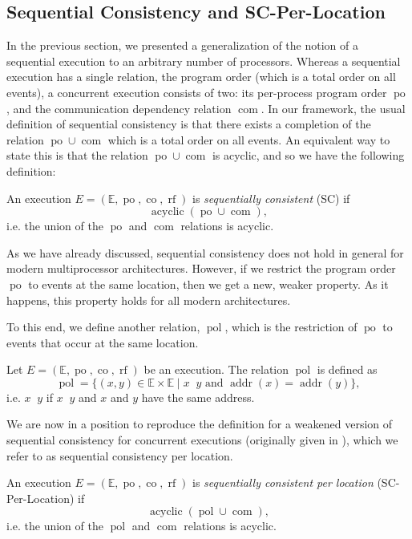 \documentclass[]{eptcs}
\newenvironment{definition}[1][Definition.]{\begin{trivlist}
\item[\hskip \labelsep {\bfseries #1}]}{\end{trivlist}}
\DeclareMathOperator{\addr}{addr}
\DeclareMathOperator{\acyclic}{acyclic}
\DeclareMathOperator{\po}{po}
\DeclareMathOperator{\pol}{pol}
\DeclareMathOperator{\co}{co}
\DeclareMathOperator{\rf}{rf}
\DeclareMathOperator{\com}{com}
\DeclareMathOperator{\poto}{\xrightarrow{po}}
\DeclareMathOperator{\polto}{\xrightarrow{pol}}
\begin{document}
\subsection{Sequential Consistency and SC-Per-Location}\label{sc-per-location-section}

In the previous section, we presented a generalization of the notion of a sequential execution to an arbitrary number of processors. Whereas a sequential execution has a single relation, the program order (which is a total order on all events), a concurrent execution consists of two: its per-process program order $\po$, and the communication dependency relation $\com$. In our framework, the usual definition of sequential consistency \cite{lamport79} is that there exists a completion of the relation $\po \cup \com$ which is a total order on all events. An equivalent way to state this is that the relation $\po \cup \com$ is acyclic, and so we have the following definition:
\begin{definition}
An execution $E = (\mathbb{E}, \po, \co, \rf)$ is \emph{sequentially consistent} (SC) if 
\[
\acyclic(\po \cup \com),
\]
i.e. the union of the $\po$ and $\com$ relations is acyclic.
\end{definition}
As we have already discussed, sequential consistency does not hold in general for modern multiprocessor architectures. However, if we restrict the program order $\po$ to events at the same location, then we get a new, weaker property. As it happens, this property holds for all modern architectures.

To this end, we define another relation, $\pol$, which is the restriction of $\po$ to events that occur at the same location.

\begin{definition}
Let $E = (\mathbb{E}, \po, \co, \rf)$ be an execution. The relation $\pol$ is defined as
\[
\pol = \{ (x,y) \in \mathbb{E} \times \mathbb{E} \mid x \poto y \text{ and } \addr(x) = \addr(y)\},
\]
i.e. $x \polto y$ if $x \poto y$ and $x$ and $y$ have the same address.
\end{definition}

We are now in a position to reproduce the definition for a weakened version of sequential consistency for concurrent executions (originally given in \cite{alglave_cats}), which we refer to as sequential consistency per location.

\begin{definition}
An execution $E = (\mathbb{E}, \po, \co, \rf)$ is \emph{sequentially consistent per location} (SC-Per-Location) if 
\[
\acyclic(\pol \cup \com),
\]
i.e. the union of the $\pol$ and $\com$ relations is acyclic.
\end{definition}
\end{document}
